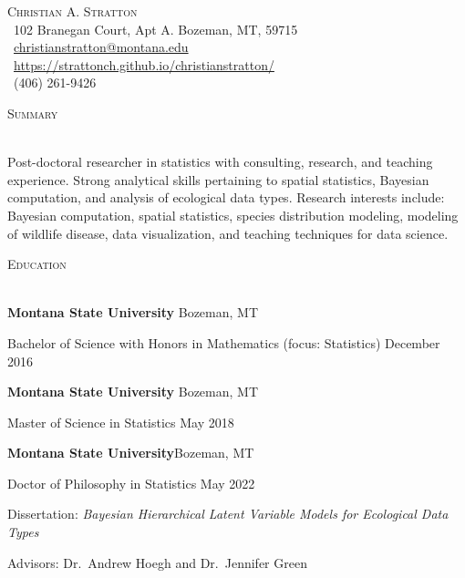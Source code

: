 \documentclass[a4paper]{article}
\newcommand{\lineunder} {
	\vspace*{-8pt} \\
	\hspace*{-18pt} \hrulefill \\
}
\newcommand{\header} [1] {
	{\hspace*{-18pt}\vspace*{6pt} \textsc{#1}}
	\vspace*{-6pt} \lineunder
}
\begin{document}
\vspace*{-40pt}
\vspace*{-10pt}
\begin{center}
{\Huge \scshape {Christian A. Stratton}} \\
\faMapMarker \ 102 Branegan Court, Apt A. Bozeman, MT, 59715 \\
\faEnvelope \ \href{mailto:christianstratton@montana.edu}{christianstratton@montana.edu} \\ 
\faGlobe \ \href{https://strattonch.github.io/christianstratton/}{https://strattonch.github.io/christianstratton/} \\
\faPhone \ (406) 261-9426 \\ 
\end{center}
\vspace*{2mm}

\header{Summary}
\vspace*{2mm}

Post-doctoral researcher in statistics with consulting, research, and
teaching experience. Strong analytical skills pertaining to spatial
statistics, Bayesian computation, and analysis of ecological data types.
Research interests include: Bayesian computation, spatial statistics,
species distribution modeling, modeling of wildlife disease, data
visualization, and teaching techniques for data science.

\header{Education}
\vspace*{2mm}

\textbf{Montana State University} \hfill Bozeman, MT

Bachelor of Science with Honors in Mathematics (focus: Statistics)
\hfill December 2016

\vspace{2mm}

\textbf{Montana State University} \hfill Bozeman, MT

Master of Science in Statistics \hfill May 2018

\vspace{2mm}

\textbf{Montana State University}\hfill Bozeman, MT

Doctor of Philosophy in Statistics \hfill May 2022

Dissertation:
\textit{Bayesian Hierarchical Latent Variable Models for Ecological Data Types}

Advisors: Dr.~Andrew Hoegh and Dr.~Jennifer Green

\vspace{2mm}
\end{document}
